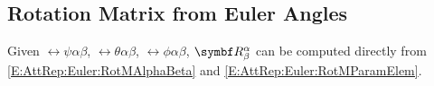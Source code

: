 \begin{comment}
\begin{equation*}
	\renewcommand{\arraystretch}{2}
	\begin{array}{||c|c||}
		\hline
		\hline
		\max \left\{ \trace{\RotM{\alpha}{\beta}}, \cRotM{\alpha}{\beta}{1,1}, \cRotM{\alpha}{\beta}{2,2}, \cRotM{\alpha}{\beta}{3,3}  \right\}	&
		\max \left\{ \abs{\cRotQ{\alpha}{\beta}{0}}, \abs{\cRotQ{\alpha}{\beta}{1}}, \abs{\cRotQ{\alpha}{\beta}{2}}, \abs{\cRotQ{\alpha}{\beta}{3}}\right\}\\[5pt]
		\hline
		\hline
		\trace{\RotM{\alpha}{\beta}} 	& \abs{\cRotQ{\alpha}{\beta}{0}} \\
		\hline
		\cRotM{\alpha}{\beta}{1,1} 		& \abs{\cRotQ{\alpha}{\beta}{1}} \\
		\hline
		\cRotM{\alpha}{\beta}{2,2} 		& \abs{\cRotQ{\alpha}{\beta}{2}} \\
		\hline
		\cRotM{\alpha}{\beta}{3,3}		& \abs{\cRotQ{\alpha}{\beta}{3}} \\
		\hline
		\hline
	\end{array}
\end{equation*}

\begin{equation*}
	\renewcommand{\arraystretch}{2}
	\begin{array}{||r||c|c|c|c||}
		\hline
		\hline
		\max \left\{ \trace{\RotM{\alpha}{\beta}}, \cRotM{\alpha}{\beta}{1,1}, \cRotM{\alpha}{\beta}{2,2}, \cRotM{\alpha}{\beta}{3,3}  \right\}	&
		\trace{\RotM{\alpha}{\beta}} &	
		\cRotM{\alpha}{\beta}{1,1} 	 &	
		\cRotM{\alpha}{\beta}{2,2} 	 &	
		\cRotM{\alpha}{\beta}{3,3}
		\\
		\hline
		\max \left\{ \abs{\cRotQ{\alpha}{\beta}{0}}, \abs{\cRotQ{\alpha}{\beta}{1}}, \abs{\cRotQ{\alpha}{\beta}{2}}, \abs{\cRotQ{\alpha}{\beta}{3}}\right\} &
		\abs{\cRotQ{\alpha}{\beta}{0}} &
		\abs{\cRotQ{\alpha}{\beta}{1}} &
		\abs{\cRotQ{\alpha}{\beta}{2}} &
		\abs{\cRotQ{\alpha}{\beta}{3}}
		\\
		\hline
		\hline
	\end{array}
\end{equation*}
\end{comment}

\subsection{Rotation Matrix from Euler Angles}
Given $\rel{\psi}{\alpha}{\beta}$, $\rel{\theta}{\alpha}{\beta}$, $\rel{\phi}{\alpha}{\beta}$, $\RotM{\alpha}{\beta}$ can be computed directly from \eqref{E:AttRep:Euler:RotMAlphaBeta} and \eqref{E:AttRep:Euler:RotMParamElem}.

